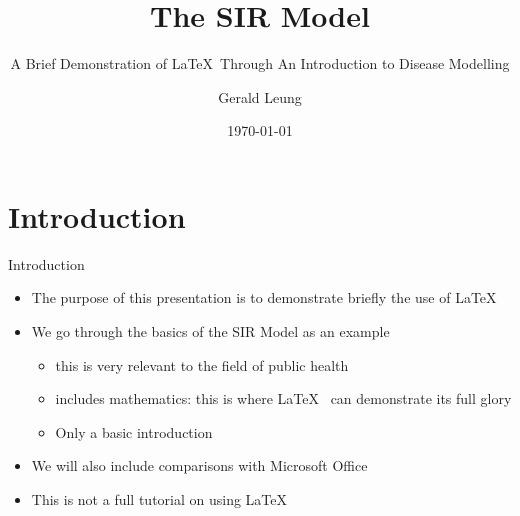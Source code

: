 \documentclass[hyperref={breaklinks,colorlinks,
   urlcolor=blue,citecolor=blue,linkcolor=red}]{beamer}
\title[\LaTeX ~Demo]
{The SIR Model}
\subtitle{A Brief Demonstration of \LaTeX ~Through An Introduction to Disease Modelling}
\author[Gerald Leung]{Gerald Leung\inst{1}} %
\institute[PHS Geospatial Team]{\inst{1}Public Health Scotland\\
\texttt{gerald.leung@phs.scot}}%
\date[\today]{\today}
\begin{document}
{
\begin{frame}
\titlepage
\end{frame}
}



\section{Introduction}

\begin{frame}{Introduction}
\begin{itemize}
\item{The purpose of this presentation is to demonstrate briefly the use of \LaTeX}
\item{We go through the basics of the SIR Model as an example}
\begin{itemize}
\item{this is very relevant to the field of public health}
\item{includes mathematics: this is where \LaTeX ~ can demonstrate its full glory}
\item{Only a basic introduction}
\end{itemize}
\item{We will also include comparisons with Microsoft Office}
\item{This is not a full tutorial on using \LaTeX}
\end{itemize}
\end{frame}
\end{document}
